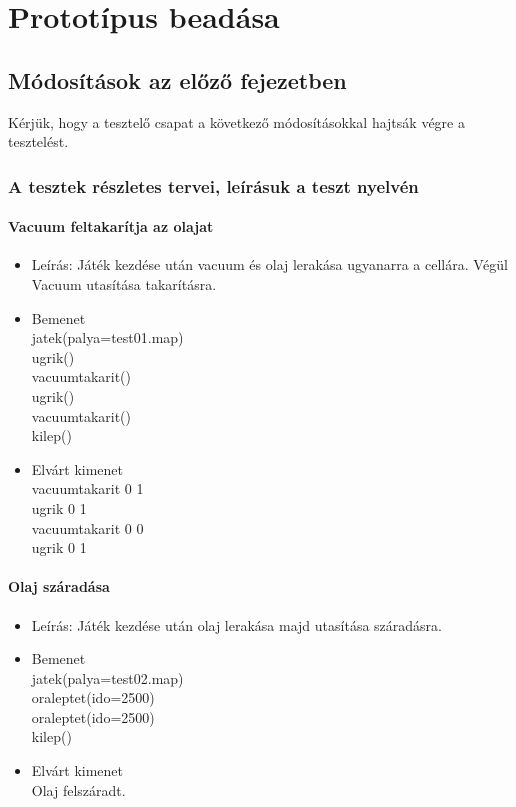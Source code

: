 %
\chapter{Prototípus beadása}

\thispagestyle{fancy}

\setcounter{section}{-1}

\section{Módosítások az előző fejezetben}
Kérjük, hogy a tesztelő csapat a következő módosításokkal hajtsák végre a tesztelést.

\subsection{A tesztek részletes tervei, leírásuk a teszt nyelvén}

\subsubsection{Vacuum feltakarítja az olajat}
\begin{itemize}
  \item Leírás: Játék kezdése után vacuum és olaj lerakása ugyanarra a cellára. Végül Vacuum utasítása takarításra.
  \item Bemenet\\
    jatek(palya=test01.map) \\
    ugrik() \\
    vacuumtakarit() \\
    ugrik() \\
    vacuumtakarit() \\
    kilep() \\
  \item Elvárt kimenet\\
    vacuumtakarit 0 1 \\
    ugrik 0 1 \\
    vacuumtakarit 0 0 \\
    ugrik 0 1 \\
\end{itemize}

\subsubsection{Olaj száradása}
\begin{itemize}
  \item Leírás: Játék kezdése után olaj lerakása majd utasítása száradásra.
  \item Bemenet\\
    jatek(palya=test02.map) \\
    oraleptet(ido=2500) \\
    oraleptet(ido=2500) \\
    kilep() \\
  \item Elvárt kimenet\\
    Olaj felszáradt.\\
\end{itemize}

